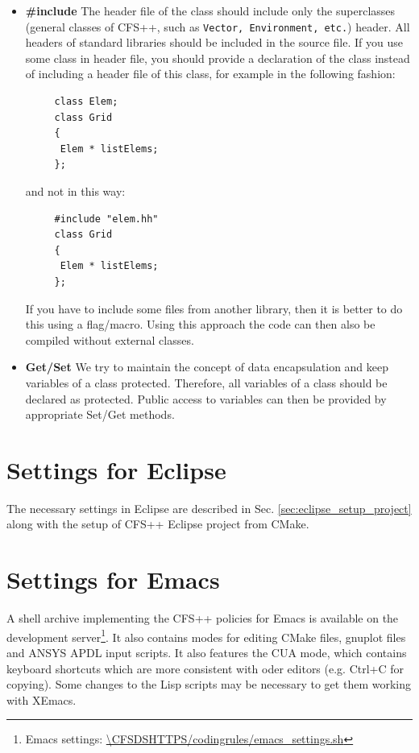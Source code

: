 \begin{itemize}
\begin{verbatim}
#include <fstream>
#include <iostream>
#include <string>
\end{verbatim}
and not like:
\begin{verbatim}
#include <fstream.h>
#include <iostream.h>
#include <string.h>
\end{verbatim}
     Note that  the .h  versions of  the C++-headers  are deprecated.  If they
     exist on a system, this is only for backward compatibility.
\item \textbf{\#include} The header file of  the class should include only the
  superclasses (general classes of CFS++, such as \texttt{Vector, Environment,
    etc.}) header. All headers of standard libraries should be included in the
  source file.  If you  use some class  in header file,  you should  provide a
  declaration of the  class instead of including a header  file of this class,
  for example in the following fashion:
     \begin{verbatim}
     class Elem;
     class Grid
     {
      Elem * listElems;
     };
     \end{verbatim}
     and not in this way:
     \begin{verbatim}
     #include "elem.hh"
     class Grid
     {
      Elem * listElems;
     };
     \end{verbatim} 
     If you have to include some files from another library, then it is better
     to do this using a flag/macro. Using this approach the code can then also
     be compiled without external classes.
\item \textbf{Get/Set}  We try to  maintain the concept of  data encapsulation
  and keep variables of a class protected. Therefore, all variables of a class
  should be  declared as  protected. Public  access to  variables can  then be
  provided by appropriate Set/Get methods.
\end{itemize}


\section{Settings for Eclipse}

The    necessary    settings    in    Eclipse   are    described    in    Sec.
\ref{sec:eclipse_setup_project} along with the  setup of CFS++ Eclipse project
from CMake.

\section{Settings for Emacs}

A shell archive implementing the CFS++  policies for Emacs is available on the
development                   server\footnote{Emacs                  settings:
  \url{\CFSDSHTTPS/codingrules/emacs_settings.sh}}.   It  also contains  modes
for editing CMake files, gnuplot files  and ANSYS APDL input scripts.  It also
features  the CUA  mode,  which  contains keyboard  shortcuts  which are  more
consistent with oder editors (e.g.  Ctrl+C  for copying).  Some changes to the
Lisp scripts may be necessary to get them working with XEmacs.
